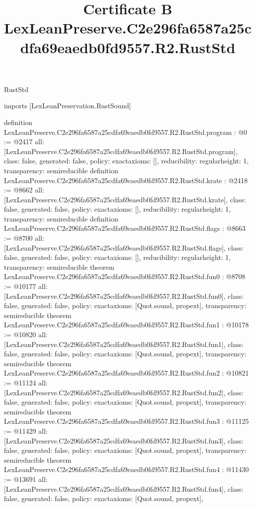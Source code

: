 \begin{lexlean}{RustStd}
\title{Certificate B LexLeanPreserve.C2e296fa6587a25cdfa69eaedb0fd9557.R2.RustStd}
\begin{coremodule}
imports [LexLeanPreservation.RustSound]

definition LexLeanPreserve.C2e296fa6587a25cdfa69eaedb0fd9557.R2.RustStd.program : @0 := @2417 {
  all: [LexLeanPreserve.C2e296fa6587a25cdfa69eaedb0fd9557.R2.RustStd.program],
  class: false,
  generated: false,
  policy: exact{axioms: []},
  reducibility: regular{height: 1},
  transparency: semireducible
}
definition LexLeanPreserve.C2e296fa6587a25cdfa69eaedb0fd9557.R2.RustStd.krate : @2418 := @8662 {
  all: [LexLeanPreserve.C2e296fa6587a25cdfa69eaedb0fd9557.R2.RustStd.krate],
  class: false,
  generated: false,
  policy: exact{axioms: []},
  reducibility: regular{height: 1},
  transparency: semireducible
}
definition LexLeanPreserve.C2e296fa6587a25cdfa69eaedb0fd9557.R2.RustStd.flags : @8663 := @8700 {
  all: [LexLeanPreserve.C2e296fa6587a25cdfa69eaedb0fd9557.R2.RustStd.flags],
  class: false,
  generated: false,
  policy: exact{axioms: []},
  reducibility: regular{height: 1},
  transparency: semireducible
}
theorem LexLeanPreserve.C2e296fa6587a25cdfa69eaedb0fd9557.R2.RustStd.fun0 : @8708 := @10177 {
  all: [LexLeanPreserve.C2e296fa6587a25cdfa69eaedb0fd9557.R2.RustStd.fun0],
  class: false,
  generated: false,
  policy: exact{axioms: [Quot.sound, propext]},
  transparency: semireducible
}
theorem LexLeanPreserve.C2e296fa6587a25cdfa69eaedb0fd9557.R2.RustStd.fun1 : @10178 := @10820 {
  all: [LexLeanPreserve.C2e296fa6587a25cdfa69eaedb0fd9557.R2.RustStd.fun1],
  class: false,
  generated: false,
  policy: exact{axioms: [Quot.sound, propext]},
  transparency: semireducible
}
theorem LexLeanPreserve.C2e296fa6587a25cdfa69eaedb0fd9557.R2.RustStd.fun2 : @10821 := @11124 {
  all: [LexLeanPreserve.C2e296fa6587a25cdfa69eaedb0fd9557.R2.RustStd.fun2],
  class: false,
  generated: false,
  policy: exact{axioms: [Quot.sound, propext]},
  transparency: semireducible
}
theorem LexLeanPreserve.C2e296fa6587a25cdfa69eaedb0fd9557.R2.RustStd.fun3 : @11125 := @11429 {
  all: [LexLeanPreserve.C2e296fa6587a25cdfa69eaedb0fd9557.R2.RustStd.fun3],
  class: false,
  generated: false,
  policy: exact{axioms: [Quot.sound, propext]},
  transparency: semireducible
}
theorem LexLeanPreserve.C2e296fa6587a25cdfa69eaedb0fd9557.R2.RustStd.fun4 : @11430 := @13691 {
  all: [LexLeanPreserve.C2e296fa6587a25cdfa69eaedb0fd9557.R2.RustStd.fun4],
  class: false,
  generated: false,
  policy: exact{axioms: [Quot.sound, propext]},
}
\end{coremodule}
\end{lexlean}
